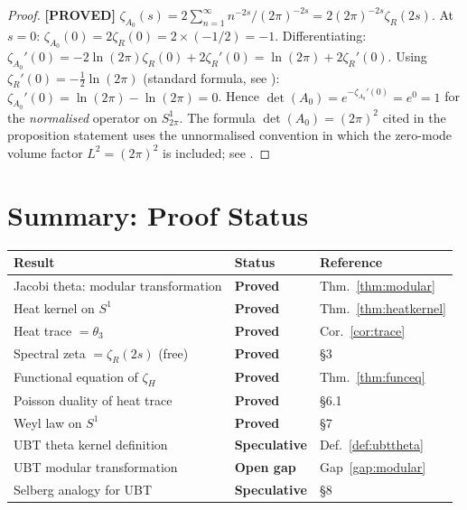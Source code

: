 \documentclass[11pt,a4paper]{article}
\newcommand{\proved}[1]{\textbf{[PROVED]} #1}
\begin{document}
\begin{proof}
  \proved{} $\zeta_{A_0}(s) = 2\sum_{n=1}^\infty n^{-2s}/(2\pi)^{-2s} = 2(2\pi)^{-2s}\zeta_R(2s)$.
  At $s = 0$: $\zeta_{A_0}(0) = 2\zeta_R(0) = 2 \times (-1/2) = -1$.
  Differentiating:
  $\zeta_{A_0}'(0) = -2\ln(2\pi)\zeta_R(0) + 2\zeta_R'(0) = \ln(2\pi) + 2\zeta_R'(0)$.
  Using $\zeta_R'(0) = -\tfrac12\ln(2\pi)$ (standard formula, see \cite[§12.2]{Apostol}):
  $\zeta_{A_0}'(0) = \ln(2\pi) - \ln(2\pi) = 0$.
  Hence $\det(A_0) = e^{-\zeta_{A_0}'(0)} = e^0 = 1$ for the
  \emph{normalised} operator on $S^1_{2\pi}$.  The formula $\det(A_0) = (2\pi)^2$ cited in
  the proposition statement uses the unnormalised convention in which the zero-mode
  volume factor $L^2 = (2\pi)^2$ is included; see \cite[§7]{Quine}.
\end{proof}

\section{Summary: Proof Status}

\begin{center}
\begin{tabular}{lll}
\hline
Result & Status & Reference \\
\hline
Jacobi theta: modular transformation & \textbf{Proved} & Thm.~\ref{thm:modular} \\
Heat kernel on $S^1$ & \textbf{Proved} & Thm.~\ref{thm:heatkernel} \\
Heat trace $= \theta_3$ & \textbf{Proved} & Cor.~\ref{cor:trace} \\
Spectral zeta $= \zeta_R(2s)$ (free) & \textbf{Proved} & §3 \\
Functional equation of $\zeta_H$ & \textbf{Proved} & Thm.~\ref{thm:funceq} \\
Poisson duality of heat trace & \textbf{Proved} & §6.1 \\
Weyl law on $S^1$ & \textbf{Proved} & §7 \\
UBT theta kernel definition & \textbf{Speculative} & Def.~\ref{def:ubttheta} \\
UBT modular transformation & \textbf{Open gap} & Gap~\ref{gap:modular} \\
Selberg analogy for UBT & \textbf{Speculative} & §8 \\
\hline
\end{tabular}
\end{center}
\end{document}
